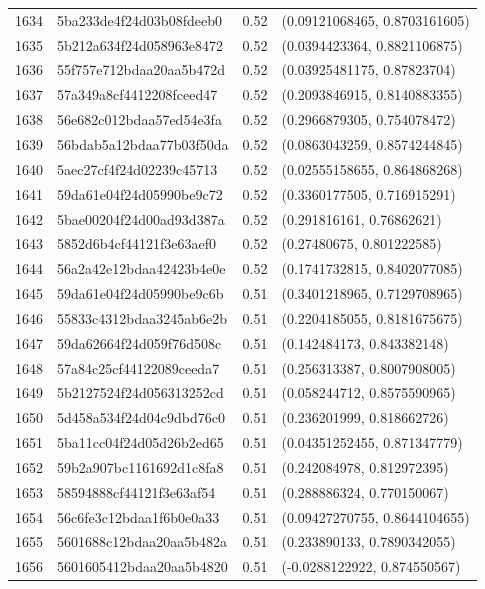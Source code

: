 \begin{table}[ht]
\begin{tabular}{rlrl}
  1634 & 5ba233de4f24d03b08fdeeb0 & 0.52 & (0.09121068465, 0.8703161605) \\ 
  1635 & 5b212a634f24d058963e8472 & 0.52 & (0.0394423364, 0.8821106875) \\ 
  1636 & 55f757e712bdaa20aa5b472d & 0.52 & (0.03925481175, 0.87823704) \\ 
  1637 & 57a349a8cf4412208fceed47 & 0.52 & (0.2093846915, 0.8140883355) \\ 
  1638 & 56e682c012bdaa57ed54e3fa & 0.52 & (0.2966879305, 0.754078472) \\ 
  1639 & 56bdab5a12bdaa77b03f50da & 0.52 & (0.0863043259, 0.8574244845) \\ 
  1640 & 5aec27cf4f24d02239c45713 & 0.52 & (0.02555158655, 0.864868268) \\ 
  1641 & 59da61e04f24d05990be9c72 & 0.52 & (0.3360177505, 0.716915291) \\ 
  1642 & 5bae00204f24d00ad93d387a & 0.52 & (0.291816161, 0.76862621) \\ 
  1643 & 5852d6b4cf44121f3e63aef0 & 0.52 & (0.27480675, 0.801222585) \\ 
  1644 & 56a2a42e12bdaa42423b4e0e & 0.52 & (0.1741732815, 0.8402077085) \\ 
  1645 & 59da61e04f24d05990be9c6b & 0.51 & (0.3401218965, 0.7129708965) \\ 
  1646 & 55833c4312bdaa3245ab6e2b & 0.51 & (0.2204185055, 0.8181675675) \\ 
  1647 & 59da62664f24d059f76d508c & 0.51 & (0.142484173, 0.843382148) \\ 
  1648 & 57a84c25cf44122089ceeda7 & 0.51 & (0.256313387, 0.8007908005) \\ 
  1649 & 5b2127524f24d056313252cd & 0.51 & (0.058244712, 0.8575590965) \\ 
  1650 & 5d458a534f24d04c9dbd76c0 & 0.51 & (0.236201999, 0.818662726) \\ 
  1651 & 5ba11cc04f24d05d26b2ed65 & 0.51 & (0.04351252455, 0.871347779) \\ 
  1652 & 59b2a907bc1161692d1c8fa8 & 0.51 & (0.242084978, 0.812972395) \\ 
  1653 & 58594888cf44121f3e63af54 & 0.51 & (0.288886324, 0.770150067) \\ 
  1654 & 56c6fe3c12bdaa1f6b0e0a33 & 0.51 & (0.09427270755, 0.8644104655) \\ 
  1655 & 5601688c12bdaa20aa5b482a & 0.51 & (0.233890133, 0.7890342055) \\ 
  1656 & 5601605412bdaa20aa5b4820 & 0.51 & (-0.0288122922, 0.874550567) \\ 

\end{tabular}
\end{table}
